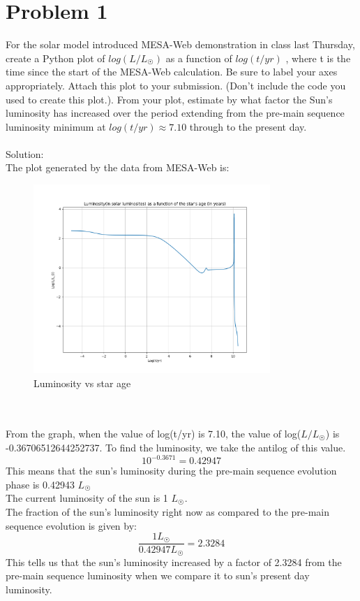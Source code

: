 \documentclass[10pt]{article}
\begin{document}
\section*{Problem 1}
For the solar model introduced MESA-Web demonstration in class last Thursday, create a Python plot of $log(L/L_{\astrosun})$ as a function of $log(t/yr)$ , where t is the time since the start of the MESA-Web calculation. Be sure to label your axes appropriately. Attach this plot to your submission. (Don’t include the code you used to create this plot.). From your plot, estimate by what factor the Sun’s luminosity has increased over the period extending from the pre-main sequence luminosity minimum at $log(t/yr) \approx 7.10$ through to the present day.
\\ \\
Solution:\\
The plot generated by the data from MESA-Web is:
\begin{figure}[h]
    \centering
    \includegraphics[width=0.8\textwidth]{hw_6_astron_310_q1.png}
    \caption{Luminosity vs star age}
    \label{fig:enter-label}
\end{figure}
\\ \\
From the graph, when the value of log(t/yr) is 7.10, the value of log($L/L_{\astrosun}$) is -0.36706512644252737. 
To find the luminosity, we take the antilog of this value.
\[ 10^{-0.3671} = 0.42947\]
This means that the sun's luminosity during the pre-main sequence evolution phase is 0.42943 $L_{\astrosun}$\\
The current luminosity of the sun is 1 $L_{\astrosun}$. \\
The fraction of the sun's luminosity right now as compared to the pre-main sequence evolution is given by:
\[ \frac{1 L_{\astrosun}}{0.42947 L_{\astrosun}} = 2.3284\]
This tells us that the sun's luminosity increased by a factor of 2.3284 from the pre-main sequence luminosity when we compare it to sun's present day luminosity.
\end{document}
